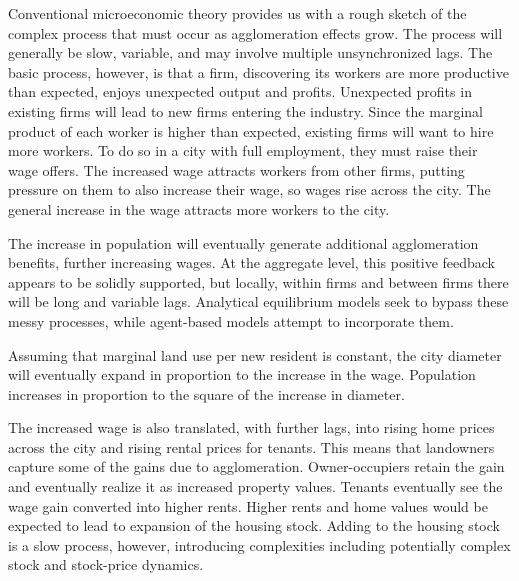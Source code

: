 Conventional microeconomic theory  provides us with a rough sketch of the complex process that must occur as agglomeration effects grow. The process will generally be slow, variable, and may involve multiple unsynchronized lags. The basic process, however, is that a firm, discovering its workers are  more productive than expected, enjoys unexpected output and profits. Unexpected profits in existing firms will lead to new firms entering the industry. Since the marginal product of each worker is higher than expected, existing firms will  want to hire more workers. To do so in a city with full employment, they must raise their  wage offers.   The increased wage attracts workers from other firms, putting pressure on them to also increase their wage, so wages rise across the city. The general increase in the wage attracts more workers to the city.

The increase in population will eventually generate additional agglomeration benefits, further increasing wages. At the aggregate level, this positive feedback appears to be solidly supported, but locally, within firms and between firms there will be long and variable lags. Analytical equilibrium models seek to bypass these messy processes, while agent-based models attempt to incorporate them.

Assuming that marginal land use per new resident is constant, the city diameter will eventually expand in proportion to the increase in the wage.%
Population increases in proportion to the square of the increase in diameter. %

The increased wage is also translated, with further lags, into rising home prices across the city and rising rental prices for tenants. This means that landowners capture some of the gains due to agglomeration. Owner-occupiers retain the gain and eventually realize it as increased  property values. Tenants eventually see the wage gain converted into higher rents. Higher rents and home values would be expected to lead to expansion of the housing stock. Adding to the housing stock is a slow process, however, introducing complexities including potentially complex stock and stock-price dynamics. %


